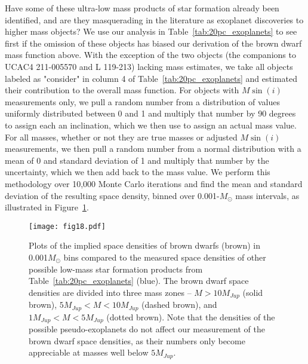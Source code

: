 \documentclass[twocolumn,tighten,twocolappendix]{aastex631}
\begin{document}
Have some of these ultra-low mass products of star formation already been identified, and are they masquerading in the literature as exoplanet discoveries to higher mass objects? We use our analysis in Table~\ref{tab:20pc_exoplanets} to see first if the omission of these objects has biased our derivation of the brown dwarf mass function above. With the exception of the two objects (the companions to UCAC4 211-005570 and L 119-213) lacking mass estimates, we take all objects labeled as "consider" in column 4 of Table~\ref{tab:20pc_exoplanets} and estimated their contribution to the overall mass function. For objects with $M \sin(i)$ measurements only, we pull a random number from a distribution of values uniformly distributed between 0 and 1 and multiply that number by 90 degrees to assign each an inclination, which we then use to assign an actual mass value. For all masses, whether or not they are true masses or adjusted $M \sin(i)$ measurements, we then pull a random number from a normal distribution with a mean of 0 and standard deviation of 1 and multiply that number by the uncertainty, which we then add back to the mass value. We perform this methodology over 10,000 Monte Carlo iterations and find the mean and standard deviation of the resulting space density, binned over 0.001-$M_\odot$ mass intervals, as illustrated in Figure~\ref{fig:space_densities_exoplanets}.

\begin{figure}
\texttt{[image: fig18.pdf]}
\caption{Plots of the implied space densities of brown dwarfs (brown) in 0.001$M_\odot$ bins compared to the measured space densities of other possible low-mass star formation products from Table~\ref{tab:20pc_exoplanets} (blue). The brown dwarf space densities are divided into three mass zones -- $M > 10M_{Jup}$ (solid brown), $5M_{Jup} < M < 10M_{Jup}$ (dashed brown), and $1M_{Jup} < M < 5M_{Jup}$ (dotted brown). Note that the densities of the possible pseudo-exoplanets do not affect our measurement of the brown dwarf space densities, as their numbers only become appreciable at masses well below $5M_{Jup}$.
\label{fig:space_densities_exoplanets}}
\end{figure}
\end{document}

